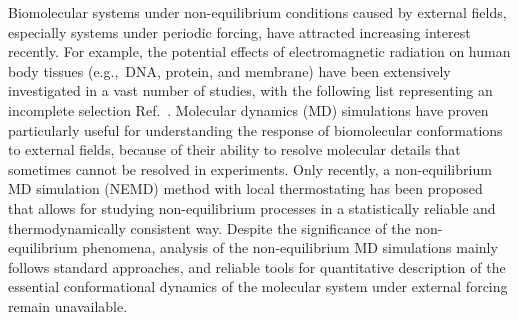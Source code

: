 \documentclass[journal=jctcce,manuscript=article]{achemso}
\begin{document}
Biomolecular systems under non-equilibrium conditions caused by external fields, especially
systems under periodic forcing, have attracted increasing
interest recently.  For example, the potential effects of electromagnetic
radiation on  human body tissues (e.g.,~DNA, protein, and membrane)  have been extensively
investigated in a vast number of studies, with the following list  representing an incomplete selection Ref.~\cite{bohr2000microwave, bohr2000microwave-1, dePomerai2000cell,
  dePomerai2003microwave, mancinelli2004non, inskip2001cellular, bekard2014electric, budi2005electric,
  budi2007effect, budi2008comparative, astrakas2012structural,
  damm2012can, english2009nonequilibrium, solomentsev2012effects}.  Molecular dynamics (MD) simulations have proven particularly useful for understanding
the response of biomolecular conformations to external fields, because of their ability to  resolve molecular
details that sometimes cannot be resolved in experiments. Only
recently, a non-equilibrium MD simulation (NEMD) method with local thermostating has been proposed~\cite{wang2014exploring} that allows for studying 
non-equilibrium processes in a statistically reliable and thermodynamically consistent way. 
Despite the significance of the non-equilibrium phenomena, 
analysis of the non-equilibrium MD simulations mainly follows standard approaches, and reliable tools for quantitative description of
the essential conformational dynamics of the molecular system under external forcing remain unavailable. 

\end{document}

